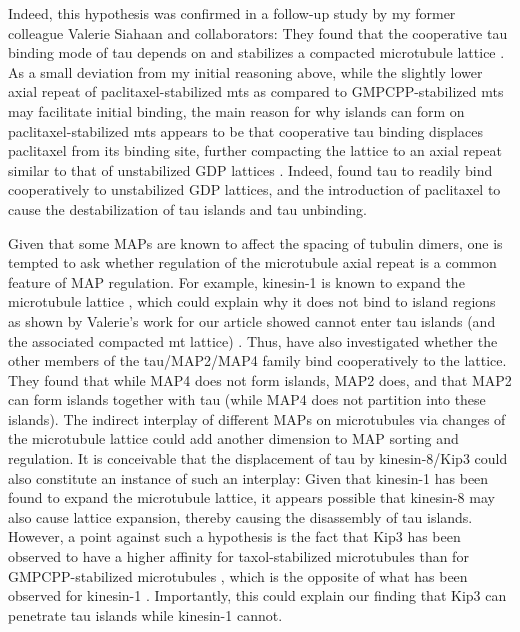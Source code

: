 Indeed, this hypothesis was confirmed in a follow-up study by my former colleague Valerie Siahaan and collaborators: They found that the cooperative tau binding mode of tau depends on and stabilizes a compacted microtubule lattice \parencite{siahaan2022microtubule}. As a small deviation from my initial reasoning above, while the slightly lower axial repeat of paclitaxel-stabilized mts as compared to GMPCPP-stabilized mts may facilitate initial binding, the main reason for why islands can form on paclitaxel-stabilized mts appears to be that cooperative tau binding displaces paclitaxel from its binding site, further compacting the lattice to an axial repeat similar to that of unstabilized GDP lattices \parencite{siahaan2022microtubule}. Indeed, \cite{siahaan2022microtubule} found tau to readily bind cooperatively to unstabilized GDP lattices, and the introduction of paclitaxel to cause the destabilization of tau islands and tau unbinding.\par

Given that some MAPs are known to affect the spacing of tubulin dimers, one is tempted to ask whether regulation of the microtubule axial repeat is a common feature of MAP regulation. For example, kinesin-1 is known to expand the microtubule lattice , which could explain why it does not bind to island regions as shown by Valerie's work for our article showed cannot enter tau islands (and the associated compacted mt lattice) . Thus, \cite{siahaan2022microtubule} have also investigated whether the other members of the tau/MAP2/MAP4 family bind cooperatively to the lattice. They found that while MAP4 does not form islands, MAP2 does, and that MAP2 can form islands together with tau (while MAP4 does not partition into these islands). The indirect interplay of different MAPs on microtubules via changes of the microtubule lattice could add another dimension to MAP sorting and regulation. It is conceivable that the displacement of tau by kinesin-8/Kip3 could also constitute an instance of such an interplay: Given that kinesin-1 has been found to expand the microtubule lattice, it appears possible that kinesin-8 may also cause lattice expansion, thereby causing the disassembly of tau islands. However, a point against such a hypothesis is the fact that Kip3 has been observed to have a higher affinity for taxol-stabilized microtubules than for GMPCPP-stabilized microtubules , which is the opposite of what has been observed for kinesin-1 . Importantly, this could explain our finding that Kip3 can penetrate tau islands while kinesin-1 cannot.\par

